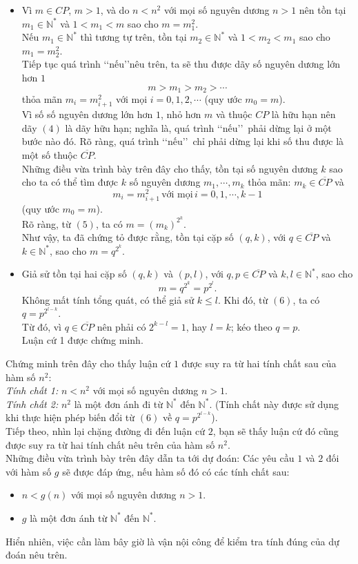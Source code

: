 \begin{itemize}
	\item Vì $m\in CP$, $m>1$, và do $n<n^2$ với mọi số nguyên dương $n>1$ nên tồn tại $m_1\in\mathbb{N}^*$ và $1<m_1<m$ sao cho $m=m_1^2$.\\
	Nếu $m_1\in\mathbb{N}^*$ thì tương tự trên, tồn tại $m_2\in\mathbb{N}^*$ và $1<m_2<m_1$ sao cho $m_1=m_2^2$.\\
	Tiếp tục quá trình \lq\lq nếu\rq\rq nêu trên, ta sẽ thu được dãy số nguyên dương lớn hơn $1$ 
	\[m>m_1>m_2>\cdots\tag{4}\] 
	thỏa mãn $m_i=m_{i+1}^2$ với mọi $i=0,1,2,\cdots$ (quy ước $m_0=m$).\\
	Vì số số nguyên dương lớn hơn $1$, nhỏ hơn $m$ và thuộc $CP$ là hữu hạn nên dãy $(4)$ là dãy hữu hạn; nghĩa là, quá trình \lq\lq nếu\rq\rq\, phải dừng lại ở một bước nào đó. Rõ ràng, quá trình \lq\lq nếu\rq\rq\, chỉ phải dừng lại khi số thu được là một số thuộc $\overline{CP}$.\\
	Những điều vừa trình bày trên đây cho thấy, tồn tại số nguyên dương $k$ sao cho ta có thể tìm được $k$ số nguyên dương $m_1,\cdots,m_k$ thỏa mãn: $m_k\in\overline{CP}$ và \[m_i=m_{i+1}^2\, \text{với mọi}\, i=0,1,\cdots,k-1\tag{5}\]
	(quy ước $m_0=m$).\\
	Rõ ràng, từ $(5)$, ta có $m=(m_k)^{2^k}$.\\
	Như vậy, ta đã chứng tỏ được rằng, tồn tại cặp số $(q,k)$, với $q\in\overline{CP}$ và $k\in\mathbb{N}^*$, sao cho $m=q^{2^k}$.
	\item Giả sử tồn tại hai cặp số $(q,k)$ và $(p,l)$, với $q,p\in\overline{CP}$ và $k,l\in\mathbb{N}^*$, sao cho \[m=q^{2^k}=p^{2^l}.\tag{6}\]
	Không mất tính tổng quát, có thể giả sử $k\le l$. Khi đó, từ $(6)$, ta có $q=p^{2^{l-k}}$.\\
	Từ đó, vì $q\in\overline{CP}$ nên phải có $2^{k-l}=1$, hay $l=k$; kéo theo $q=p$.\\
	Luận cứ 1 được chứng minh.      
\end{itemize}
Chứng minh trên đây cho thấy luận cứ $1$ được suy ra từ hai tính chất sau của hàm số $n^2$:\\
\noindent \textit{Tính chất 1:} $n<n^2$ với mọi số nguyên dương $n>1$.\\
\textit{Tính chất 2:} $n^2$ là một đơn ánh đi từ $\mathbb{N}^*$ đến $\mathbb{N}^*$. (Tính chất này được sử dụng khi thực hiện phép biến đổi từ $(6)$ về $q=p^{2^{l-k}}$).\\
Tiếp theo, nhìn lại chặng đường đi đến luận cứ $2$, bạn sẽ thấy luận cứ đó cũng được suy ra từ hai tính chất nêu trên của hàm số $n^2$.\\
Những điều vừa trình bày trên đây dẫn ta tới dự đoán: Các yêu cầu $1$ và $2$ đối với hàm số $g$ sẽ được đáp ứng, nếu hàm số đó có các tính chất sau:
\begin{itemize}
	\item $n<g(n)$ với mọi số nguyên dương $n>1$.
	\item $g$ là một đơn ánh từ $\mathbb{N}^*$ đến $\mathbb{N}^*$.
\end{itemize}
\noindent Hiển nhiên, việc cần làm bây giờ là vận nội công để kiểm tra tính đúng của dự đoán nêu trên.